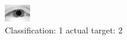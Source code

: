 \begin{figure}[h!]
\begin{center}
\includegraphics[width=0.60\columnwidth]{figures/ID2294_class_1_target_2.png}
\end{center}
\caption{ Classification: 1 actual target: 2}
\label{fig:ID2294_class_1_target_2}
\end{figure}
